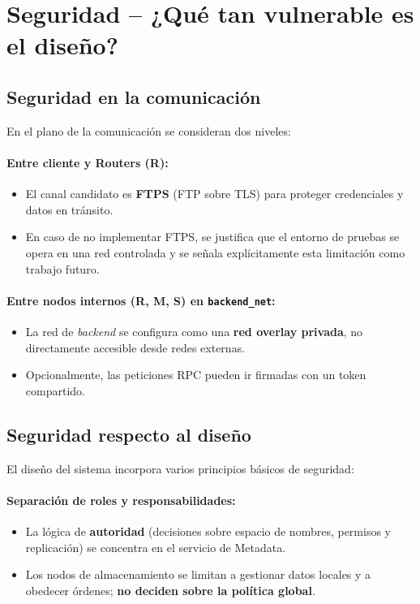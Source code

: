 \documentclass{article}
\begin{document}
\section{Seguridad – ¿Qué tan vulnerable es el diseño?}

\subsection{Seguridad en la comunicación}
En el plano de la comunicación se consideran dos niveles:

\paragraph{Entre cliente y Routers (R):}
\begin{itemize}
    \item El canal candidato es \textbf{FTPS} (FTP sobre TLS) para proteger credenciales y datos en tránsito.
    \item En caso de no implementar FTPS, se justifica que el entorno de pruebas se opera en una red controlada y se señala explícitamente esta limitación como trabajo futuro.
\end{itemize}

\paragraph{Entre nodos internos (R, M, S) en \texttt{backend\_net}:}
\begin{itemize}
    \item La red de \emph{backend} se configura como una \textbf{red overlay privada}, no directamente accesible desde redes externas.
    \item Opcionalmente, las peticiones RPC pueden ir firmadas con un token compartido.
\end{itemize}

\subsection{Seguridad respecto al diseño}
El diseño del sistema incorpora varios principios básicos de seguridad:

\paragraph{Separación de roles y responsabilidades:}
\begin{itemize}
    \item La lógica de \textbf{autoridad} (decisiones sobre espacio de nombres, permisos y replicación) se concentra en el servicio de Metadata.
    \item Los nodos de almacenamiento se limitan a gestionar datos locales y a obedecer órdenes; \textbf{no deciden sobre la política global}.
\end{itemize}
\end{document}
